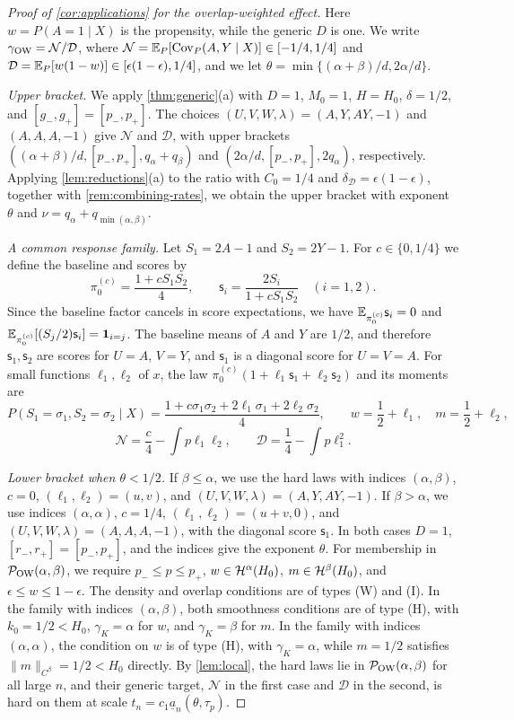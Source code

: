\begin{proof}[Proof of \cref{cor:applications} for the overlap-weighted effect]
Here $w=P(A=1\mid X)$ is the propensity, while the generic $D$ is one.
We write $\gamma_{\rm OW}=\mathcal N/\mathcal D$, where
$\mathcal N=\mathbb E_P[\operatorname{Cov}_P(A,Y\mid X)]\in[-1/4,1/4]$ and
$\mathcal D=\mathbb E_P[w(1-w)]\in[\epsilon(1-\epsilon),1/4]$, and we let
$\theta=\min\{(\alpha+\beta)/d,2\alpha/d\}$.

\emph{Upper bracket.} We apply \cref{thm:generic}(a) with
$D=1$, $M_0=1$, $H=H_0$, $\delta=1/2$, and $[g_-,g_+]=[p_-,p_+]$.
The choices $(U,V,W,\lambda)=(A,Y,AY,-1)$ and $(A,A,A,-1)$ give
$\mathcal N$ and $\mathcal D$, with upper brackets
$((\alpha+\beta)/d,[p_-,p_+],q_\alpha+q_\beta)$ and
$(2\alpha/d,[p_-,p_+],2q_\alpha)$, respectively. Applying
\cref{lem:reductions}(a) to the ratio with $C_0=1/4$ and
$\delta_{\mathcal D}=\epsilon(1-\epsilon)$, together with
\cref{rem:combining-rates}, we obtain the upper bracket with
exponent
$\theta$ and $\nu=q_\alpha+q_{\min(\alpha,\beta)}$.

\emph{A common response family.} Let $S_1=2A-1$ and $S_2=2Y-1$.
For $c\in\{0,1/4\}$ we define the baseline and scores by
\[
 \pi_0^{(c)}=\frac{1+cS_1S_2}{4},\qquad
 \mathsf s_i=\frac{2S_i}{1+cS_1S_2}\quad(i=1,2).
\]
Since the baseline factor cancels in score expectations, we have
$\mathbb E_{\pi_0^{(c)}}\mathsf s_i=0$ and
$\mathbb E_{\pi_0^{(c)}}[(S_j/2)\mathsf s_i]=\mathbf1_{i=j}$. The baseline means
of $A$ and $Y$ are $1/2$, and therefore $\mathsf s_1,\mathsf s_2$ are
scores for
$U=A$, $V=Y$, and $\mathsf s_1$ is a diagonal score for $U=V=A$.
For small functions $\ell_1,\ell_2$ of $x$, the law
$\pi_0^{(c)}(1+\ell_1\mathsf s_1+\ell_2\mathsf s_2)$ and its moments are
\[
 P(S_1=\sigma_1,S_2=\sigma_2\mid X)
 =\frac{1+c\sigma_1\sigma_2+2\ell_1\sigma_1+2\ell_2\sigma_2}{4},
 \qquad w=\frac12+\ell_1,\quad m=\frac12+\ell_2,
\]
\[
 \mathcal N=\frac c4-\int p\ell_1\ell_2,\qquad
 \mathcal D=\frac14-\int p\ell_1^2.
\]

\emph{Lower bracket when $\theta<1/2$.} If $\beta\le\alpha$, we use the
hard laws with indices $(\alpha,\beta)$, $c=0$, $(\ell_1,\ell_2)=(u,v)$,
and $(U,V,W,\lambda)=(A,Y,AY,-1)$. If $\beta>\alpha$, we use indices
$(\alpha,\alpha)$, $c=1/4$, $(\ell_1,\ell_2)=(u+v,0)$, and
$(U,V,W,\lambda)=(A,A,A,-1)$, with the diagonal score $\mathsf s_1$.
In both cases $D=1$, $[r_-,r_+]=[p_-,p_+]$, and the indices give the
exponent $\theta$. For membership in $\mathcal P_{\rm OW}(\alpha,\beta)$, we
require $p_-\le p\le p_+$, $w\in\mathcal H^\alpha(H_0)$,
$m\in\mathcal H^\beta(H_0)$, and $\epsilon\le w\le1-\epsilon$. The density and
overlap conditions are of types (W) and (I). In the family with indices
$(\alpha,\beta)$, both smoothness conditions are of type (H), with
$k_0=1/2<H_0$, $\gamma_K=\alpha$ for $w$, and $\gamma_K=\beta$ for $m$.
In the family with indices $(\alpha,\alpha)$, the condition on $w$ is
of type (H), with $\gamma_K=\alpha$, while $m=1/2$ satisfies
$\|m\|_{C^\beta}=1/2<H_0$ directly. By \cref{lem:local}, the hard
laws lie in $\mathcal P_{\rm OW}(\alpha,\beta)$ for all large $n$, and their
generic target, $\mathcal N$ in the first case and $\mathcal D$ in the
second, is hard on them at scale $t_n=c_1\underline a_n(\theta,\tau_p)$.


\end{proof}

